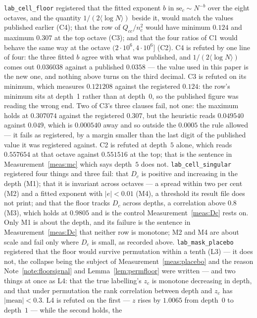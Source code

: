 \documentclass[11pt,a4paper]{article}
\theoremstyle{plain}
\theoremstyle{definition}
\theoremstyle{remark}
\begin{document}
\texttt{lab\_cell\_floor} registered that the fitted exponent $b$ in
$\mathrm{se}_c\sim N^{-b}$ over the eight octaves, and the quantity
$1/(2\langle\log N\rangle)$ beside it, would match the values published
earlier (C4); that the row of $Q_{cc}/n_c^2$ would have minimum
$0.124$ and maximum $0.307$ at the top octave (C3); and that the four
ratios of C1 would behave the same way at the octave
$(2\cdot10^6,4\cdot10^6]$ (C2). C4 is refuted by one line of four: the
three fitted $b$ agree with what was published, and
$1/(2\langle\log N\rangle)$ comes out $0.036038$ against a published
$0.0358$ --- the value used in this paper is the new one, and nothing
above turns on the third decimal. C3 is refuted on its minimum, which
measures $0.121208$ against the registered $0.124$: the row's minimum
sits at depth~1 rather than at depth~0, so the published figure was
reading the wrong end. Two of C3's three clauses fail, not one: the
maximum holds at $0.307074$ against the registered $0.307$, but the
heuristic reads $0.049540$ against $0.049$, which is $0.000540$ away
and so outside the $0.0005$ the rule allowed --- it fails as
registered, by a margin smaller than the last digit of the published
value it was registered against. C2 is
refuted at depth~$5$ alone, which reads $0.557654$ at that octave
against $0.551516$ at the top; that is the sentence in
Measurement~\ref{meas:mc} which says depth~$5$ does not.
\texttt{lab\_cell\_singular}
registered four things and three fail: that $D_c$ is positive and
increasing in the depth (M1); that it is invariant across octaves ---
a spread within two per cent (M2) and a fitted exponent with
$|e|<0.01$ (M4), a threshold its result file does not print; and that
the floor tracks $D_c$ across depths, a correlation above $0.8$ (M3),
which holds at $0.9805$ and is the control
Measurement~\ref{meas:Dc} rests on. Only M1 is about the depth, and its failure is the
sentence in Measurement~\ref{meas:Dc} that neither row is monotone;
M2 and M4 are about scale and fail only where $D_c$ is small, as
recorded above.
\texttt{lab\_mask\_placebo} registered that the floor would survive
permutation within a tenth (L3) --- it does not, the collapse being
the subject of Measurement~\ref{meas:placebo} and the reason
Note~\ref{note:floorsignal} and Lemma~\ref{lem:permfloor} were
written --- and two things at once as L4: that
the true labelling's $z_c$ is monotone decreasing in depth, and that
under permutation the rank correlation between depth and $z_c$ has
$|\mathrm{mean}|<0.3$. L4 is refuted on the first --- $z$ rises by
$1.0065$ from depth~$0$ to depth~$1$ --- while the second holds, the
\end{document}
